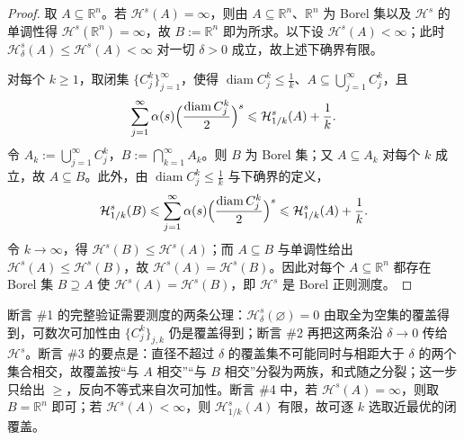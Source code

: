 \documentclass[../../main.tex]{subfiles}%
\begin{document}
\begin{proof}
取 $A\subseteq\mathbb{R}^n$。若 $\mathcal{H}^s(A)=\infty$，则由 $A\subseteq\mathbb{R}^n$、$\mathbb{R}^n$ 为 Borel 集以及 $\mathcal{H}^s$ 的单调性得 $\mathcal{H}^s(\mathbb{R}^n)=\infty$，故 $B:=\mathbb{R}^n$ 即为所求。以下设 $\mathcal{H}^s(A)<\infty$；此时 $\mathcal{H}^s_\delta(A)\leqslant\mathcal{H}^s(A)<\infty$ 对一切 $\delta>0$ 成立，故上述下确界有限。

对每个 $k\geqslant1$，取闭集 $\{C_j^k\}_{j=1}^{\infty}$，使得 $\operatorname{diam}C_j^k\leqslant\frac1k$、$A\subseteq\bigcup_{j=1}^{\infty}C_j^k$，且
\begin{align*}
\sum_{j=1}^{\infty}\alpha(s)\Bigl(\frac{\operatorname{diam}C_j^k}{2}\Bigr)^s\leqslant\mathcal{H}^s_{1/k}(A)+\frac1k.
\end{align*}
令 $A_k:=\bigcup_{j=1}^{\infty}C_j^k$，$B:=\bigcap_{k=1}^{\infty}A_k$。则 $B$ 为 Borel 集；又 $A\subseteq A_k$ 对每个 $k$ 成立，故 $A\subseteq B$。此外，由 $\operatorname{diam}C_j^k\leqslant\frac1k$ 与下确界的定义，
\begin{align*}
\mathcal{H}^s_{1/k}(B)\leqslant\sum_{j=1}^{\infty}\alpha(s)\Bigl(\frac{\operatorname{diam}C_j^k}{2}\Bigr)^s\leqslant\mathcal{H}^s_{1/k}(A)+\frac1k.
\end{align*}
令 $k\to\infty$，得 $\mathcal{H}^s(B)\leqslant\mathcal{H}^s(A)$；而 $A\subseteq B$ 与单调性给出 $\mathcal{H}^s(A)\leqslant\mathcal{H}^s(B)$，故 $\mathcal{H}^s(A)=\mathcal{H}^s(B)$。因此对每个 $A\subseteq\mathbb{R}^n$ 都存在 Borel 集 $B\supseteq A$ 使 $\mathcal{H}^s(A)=\mathcal{H}^s(B)$，即 $\mathcal{H}^s$ 是 Borel 正则测度。
\end{proof}

\begin{remark}\label{remark:ch02-thm-2-1-补证说明}
断言 \#1 的完整验证需要测度的两条公理：$\mathcal{H}^s_\delta(\varnothing)=0$ 由取全为空集的覆盖得到，可数次可加性由 $\{C_j^k\}_{j,k}$ 仍是覆盖得到；断言 \#2 再把这两条沿 $\delta\to0$ 传给 $\mathcal{H}^s$。断言 \#3 的要点是：直径不超过 $\delta$ 的覆盖集不可能同时与相距大于 $\delta$ 的两个集合相交，故覆盖按“与 $A$ 相交”“与 $B$ 相交”分裂为两族，和式随之分裂；这一步只给出 $\geqslant$，反向不等式来自次可加性。断言 \#4 中，若 $\mathcal{H}^s(A)=\infty$，则取 $B=\mathbb{R}^n$ 即可；若 $\mathcal{H}^s(A)<\infty$，则 $\mathcal{H}^s_{1/k}(A)$ 有限，故可逐 $k$ 选取近最优的闭覆盖。
\end{remark}
\end{document}
